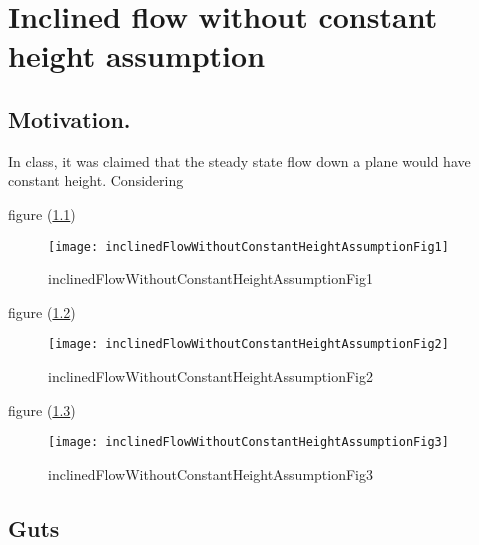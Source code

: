 
%

\chapter{Inclined flow without constant height assumption}
\label{chap:inclinedFlowWithoutConstantHeightAssumption}
{}
\date{Mar 6, 2012}

\beginArtWithToc

\section{Motivation.}

In class, it was claimed that the steady state flow down a plane would have constant height.  Considering 

figure (\ref{fig:inclinedFlowWithoutConstantHeightAssumption:inclinedFlowWithoutConstantHeightAssumptionFig1})
\begin{figure}[htp]
   \centering
   \texttt{[image: inclinedFlowWithoutConstantHeightAssumptionFig1]}
   \caption{inclinedFlowWithoutConstantHeightAssumptionFig1}\label{fig:inclinedFlowWithoutConstantHeightAssumption:inclinedFlowWithoutConstantHeightAssumptionFig1}
\end{figure}

figure (\ref{fig:inclinedFlowWithoutConstantHeightAssumption:inclinedFlowWithoutConstantHeightAssumptionFig2})
\begin{figure}[htp]
   \centering
   \texttt{[image: inclinedFlowWithoutConstantHeightAssumptionFig2]}
   \caption{inclinedFlowWithoutConstantHeightAssumptionFig2}\label{fig:inclinedFlowWithoutConstantHeightAssumption:inclinedFlowWithoutConstantHeightAssumptionFig2}
\end{figure}

figure (\ref{fig:inclinedFlowWithoutConstantHeightAssumption:inclinedFlowWithoutConstantHeightAssumptionFig3})
\begin{figure}[htp]
   \centering
   \texttt{[image: inclinedFlowWithoutConstantHeightAssumptionFig3]}
   \caption{inclinedFlowWithoutConstantHeightAssumptionFig3}\label{fig:inclinedFlowWithoutConstantHeightAssumption:inclinedFlowWithoutConstantHeightAssumptionFig3}
\end{figure}

\section{Guts}

\EndArticle
